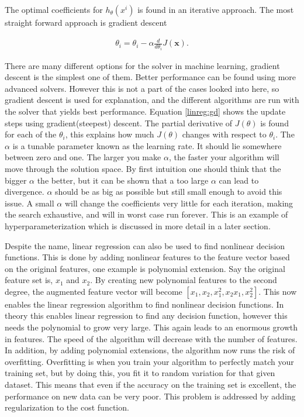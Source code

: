             The optimal coefficients for $h_\theta(x^i)$ is found in an iterative approach. The most straight forward approach is gradient descent 
            
            \begin{align}
                \theta_i = \theta_i - \alpha \frac{d}{d\theta_i}J(\bm x).
                \label{linreg:gd}
            \end{align}
            
            
            There are many different options for the solver in machine learning, gradient descent is the simplest one of them. Better performance can be found using more advanced solvers. However this is not a part of the cases looked into here, so gradient descent is used for explanation, and the different algorithms are run with the solver that yields best performance. Equation \ref{linreg:gd} shows the update steps using gradient(steepest) descent. The partial derivative of $J(\theta)$ is found for each of the $\theta_i$, this explains how much $J(\theta)$ changes with respect to $\theta_i$. The $\alpha$ is a tunable parameter known as the learning rate. It should lie somewhere between zero and one. The larger you make $\alpha$, the faster your algorithm will move through the solution space. By first intuition one should think that the bigger $\alpha$ the better, but it can be shown that a too large $\alpha$ can lead to divergence. $\alpha$ should be as big as possible but still small enough to avoid this issue. A small $\alpha$ will change the coefficients very little for each iteration, making the search exhaustive, and will in worst case run forever. This is an example of hyperparameterization which is discussed in more detail in a later section. 
            
            Despite the name, linear regression can also be used to find nonlinear decision functions. This is done by adding nonlinear features to the feature vector based on the original features, one example is polynomial extension. Say the original feature set is, $x_1$ and $x_2$. By creating new polynomial features to the second degree, the augmented feature vector will become $[x_1, x_2, x_1^2, x_2x_1, x_2^2 ]$. This now enables the linear regression algorithm to find nonlinear decision functions. In theory this enables linear regression to find any decision function, however this needs the polynomial to grow very large. This again leads to an enormous growth in features. The speed of the algorithm will decrease with the number of features. In addition, by adding polynomial extensions, the algorithm now runs the risk of overfitting. Overfitting is when you train your algorithm to perfectly match your training set, but by doing this, you fit it to random variation for that given dataset. This means that even if the accuracy on the training set is excellent, the performance on new data can be very poor. This problem is addressed by adding regularization to the cost function. 
            
